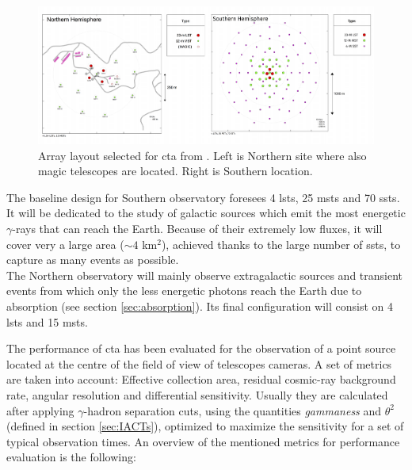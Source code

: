 \documentclass[main.tex]{subfiles}
\begin{document}
\begin{figure}[h]
\centering
 \includegraphics[width=1\textwidth]{Pictures/Array-Layouts.pdf}
  \caption{Array layout selected for \gls{cta} from \cite{CTAPerformance}. Left is Northern site where also \gls{magic} telescopes are located. Right is Southern location.}
    \label{fig:arraylayout}
\end{figure}

The baseline design for Southern observatory foresees 4 \glspl{lst}, 25 \glspl{mst} and 70 \glspl{sst}. It will be dedicated to the study of galactic sources which emit the most energetic $\gamma$-rays that can reach the Earth. Because of their extremely low fluxes, it will cover very a large area ($\sim4$ km$^2$), achieved thanks to the large number of \glspl{sst}, to capture as many events as possible.\\
The Northern observatory will mainly observe extragalactic sources and transient events from which only the less energetic photons reach the Earth due to absorption (see section \ref{sec:absorption}). Its final configuration will consist on 4 \glspl{lst} and 15 \glspl{mst}.

The performance of \gls{cta} has been evaluated for the observation of a point source located at the centre of the field of view of telescopes cameras. A set of metrics are taken into account: Effective collection area, residual cosmic-ray background rate, angular resolution and differential sensitivity. Usually they are calculated after applying $\gamma$-hadron separation cuts, using the quantities \textit{gammaness} and $\theta^2$ (defined in section \ref{sec:IACTs}), optimized to maximize the sensitivity for a set of typical observation times.
An overview of the mentioned metrics for performance evaluation is the following:\\
\end{document}
